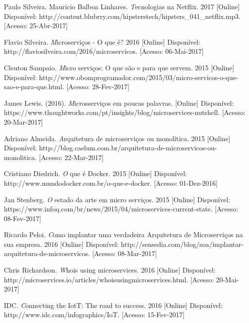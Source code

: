 \documentclass[journal]{IEEEtran}
\begin{document}
\ifCLASSOPTIONcaptionsoff
  \newpage
\fi

\begin{thebibliography}{1}

Paulo Silveira. Mauricio Balboa Linhares. \emph Tecnologias na Netflix. 2017 [Online] Disponível: http://content.blubrry.com/hipsterstech/hipsters\_041\_netflix.mp3. [Acesso: 25-Abr-2017]

Flavio Silveira. \emph Microserviços - O que é? 2016 [Online] Disponível:
http://flaviosilveira.com/2016/microservicos. [Acesso: 06-Mai-2017]

Cleuton Sampaio. \emph Micro serviços: O que são e para que servem. 2015 [Online] Disponível: http://www.obomprogramador.com/2015/03/micro-servicos-o-que-sao-e-para-que.html. [Acesso: 28-Fev-2017] 

James Lewis. (2016). \emph Microsserviços em poucas palavras. [Online] Disponível: https://www.thoughtworks.com/pt/insights/blog/microservices-nutshell. [Acesso: 20-Mar-2017]

Adriano Almeida. \emph Arquitetura de microserviços ou monolítica. 2015 [Online] Disponível: http://blog.caelum.com.br/arquitetura-de-microservicos-ou-monolitica. [Acesso: 22-Mar-2017]

Cristiano Diedrich. \emph O que é Docker. 2015 [Online] Disponível: http://www.mundodocker.com.br/o-que-e-docker. [Acesso: 01-Dez-2016]

Jan Stenberg. \emph O estado da arte em micro serviços. 2015 [Online] Disponível: https://www.infoq.com/br/news/2015/04/microservices-current-state. [Acesso: 08-Fev-2017]

Ricardo Peloi. \emph Como implantar uma verdadeira Arquitetura de Microserviços na sua empresa. 2016 [Online] Disponível: http://sensedia.com/blog/soa/implantar-arquitetura-de-microservicos. [Acesso: 08-Mar-2017]

Chris Richardson. \emph Whois using microservices. 2016 [Online] Disponível: http://microservices.io/articles/whoisusingmicroservices.html. [Acesso: 20-Mai-2017]

IDC. \emph Connecting the IotT: The road to success. 2016 [Online] Disponível: http://www.idc.com/infographics/IoT. [Acesso: 15-Fev-2017]


\end{thebibliography}
\end{document}
